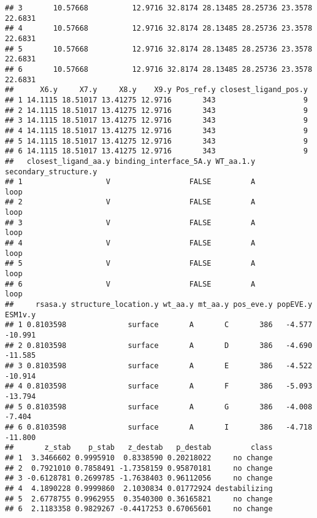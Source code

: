 \documentclass[
]{article}
\newenvironment{Shaded}{\begin{snugshade}}{\end{snugshade}}
\newcommand{\ConstantTok}[1]{\textcolor[rgb]{0.56,0.35,0.01}{#1}}
\newcommand{\FunctionTok}[1]{\textcolor[rgb]{0.13,0.29,0.53}{\textbf{#1}}}
\newcommand{\NormalTok}[1]{#1}
\newcommand{\OtherTok}[1]{\textcolor[rgb]{0.56,0.35,0.01}{#1}}
\newcommand{\SpecialCharTok}[1]{\textcolor[rgb]{0.81,0.36,0.00}{\textbf{#1}}}
\begin{document}
\begin{verbatim}
## 3       10.57668          12.9716 32.8174 28.13485 28.25736 23.3578 22.6831
## 4       10.57668          12.9716 32.8174 28.13485 28.25736 23.3578 22.6831
## 5       10.57668          12.9716 32.8174 28.13485 28.25736 23.3578 22.6831
## 6       10.57668          12.9716 32.8174 28.13485 28.25736 23.3578 22.6831
##      X6.y     X7.y     X8.y    X9.y Pos_ref.y closest_ligand_pos.y
## 1 14.1115 18.51017 13.41275 12.9716       343                    9
## 2 14.1115 18.51017 13.41275 12.9716       343                    9
## 3 14.1115 18.51017 13.41275 12.9716       343                    9
## 4 14.1115 18.51017 13.41275 12.9716       343                    9
## 5 14.1115 18.51017 13.41275 12.9716       343                    9
## 6 14.1115 18.51017 13.41275 12.9716       343                    9
##   closest_ligand_aa.y binding_interface_5A.y WT_aa.1.y secondary_structure.y
## 1                   V                  FALSE         A                  loop
## 2                   V                  FALSE         A                  loop
## 3                   V                  FALSE         A                  loop
## 4                   V                  FALSE         A                  loop
## 5                   V                  FALSE         A                  loop
## 6                   V                  FALSE         A                  loop
##     rsasa.y structure_location.y wt_aa.y mt_aa.y pos_eve.y popEVE.y ESM1v.y
## 1 0.8103598              surface       A       C       386   -4.577 -10.991
## 2 0.8103598              surface       A       D       386   -4.690 -11.585
## 3 0.8103598              surface       A       E       386   -4.522 -10.914
## 4 0.8103598              surface       A       F       386   -5.093 -13.794
## 5 0.8103598              surface       A       G       386   -4.008  -7.404
## 6 0.8103598              surface       A       I       386   -4.718 -11.800
##       z_stab    p_stab   z_destab   p_destab         class
## 1  3.3466602 0.9995910  0.8338590 0.20218022     no change
## 2  0.7921010 0.7858491 -1.7358159 0.95870181     no change
## 3 -0.6128781 0.2699785 -1.7638403 0.96112056     no change
## 4  4.1890228 0.9999860  2.1030834 0.01772924 destabilizing
## 5  2.6778755 0.9962955  0.3540300 0.36165821     no change
## 6  2.1183358 0.9829267 -0.4417253 0.67065601     no change
\end{verbatim}

\begin{Shaded}
\end{Shaded}
\end{document}

